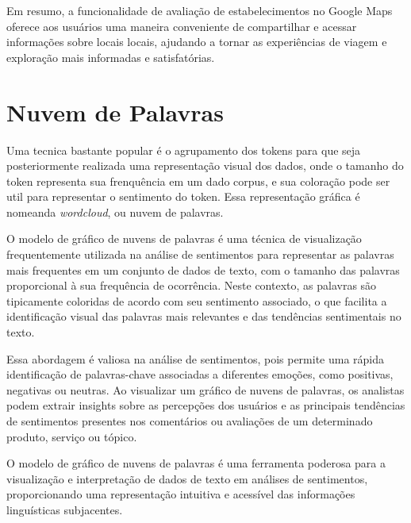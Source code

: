 Em resumo, a funcionalidade de avaliação de estabelecimentos no Google Maps oferece aos usuários uma maneira conveniente de compartilhar e acessar informações sobre locais locais, ajudando a tornar as experiências de viagem e exploração mais informadas e satisfatórias.

\section{Nuvem de Palavras}
\label{cap:fund_teorica:sec:word_cloud}
%
Uma tecnica bastante popular é o agrupamento dos tokens para que seja posteriormente realizada uma representação visual dos dados, onde o tamanho do token representa sua frenquência em um dado corpus, e sua coloração pode ser util para representar o sentimento do token. Essa representação gráfica é nomeanda \emph{wordcloud}, ou nuvem de palavras.

O modelo de gráfico de nuvens de palavras é uma técnica de visualização frequentemente utilizada na análise de sentimentos para representar as palavras mais frequentes em um conjunto de dados de texto, com o tamanho das palavras proporcional à sua frequência de ocorrência. Neste contexto, as palavras são tipicamente coloridas de acordo com seu sentimento associado, o que facilita a identificação visual das palavras mais relevantes e das tendências sentimentais no texto.

Essa abordagem é valiosa na análise de sentimentos, pois permite uma rápida identificação de palavras-chave associadas a diferentes emoções, como positivas, negativas ou neutras. Ao visualizar um gráfico de nuvens de palavras, os analistas podem extrair insights sobre as percepções dos usuários e as principais tendências de sentimentos presentes nos comentários ou avaliações de um determinado produto, serviço ou tópico.

O modelo de gráfico de nuvens de palavras é uma ferramenta poderosa para a visualização e interpretação de dados de texto em análises de sentimentos, proporcionando uma representação intuitiva e acessível das informações linguísticas subjacentes.

